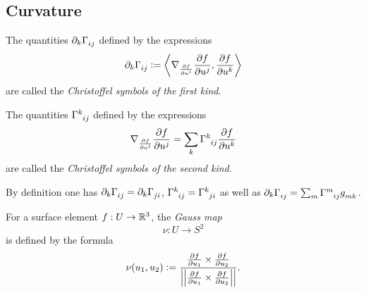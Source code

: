 \documentclass[stu, babel, american, biblatex, a4paper, leqno, draftall]{apa7}
\begin{document}
\subsection{Curvature}
\begin{definition}\label{Manifold:ChristoffelSymbol}
    
    \begin{APAenumerate}
        \item The quantities $\partial_k\tensor{\Gamma}{_i_j}$ defined by the expressions
              \begin{equation*}
                \partial_k\tensor{\Gamma}{_i_j}
                \defeq
                \inner{\nabla_{\frac{\partial f}{\partial\tensor{u}{^i}}}\frac{\partial f}{\partial\tensor{u}{^j}}}{\frac{\partial f}{\partial\tensor{u}{^k}}}
              \end{equation*}
              are called the \textit{Christoffel symbols of the first kind}.
        \item The quantities $\tensor{\Gamma}{^k_i_j}$ defined by the expressions
        \begin{equation*}
          \nabla_{\frac{\partial f}{\partial\tensor{u}{^i}}}\frac{\partial f}{\partial\tensor{u}{^j}}
          =
          \sum_k{\tensor{\Gamma}{^k_i_j}\frac{\partial f}{\partial\tensor{u}{^k}}}
        \end{equation*}
        are called the \textit{Christoffel symbols of the second kind}.
        \item By definition one has $\partial_k\tensor{\Gamma}{_i_j}=\partial_k\tensor{\Gamma}{_j_i}$, $\tensor{\Gamma}{^k_i_j}=\tensor{\Gamma}{^k_j_i}$
        as well as $\partial_k\tensor{\Gamma}{_i_j}=\sum_{m}\tensor{\Gamma}{^m_i_j}\tensor{g}{_m_k}$.
    \end{APAenumerate}
\end{definition}
\begin{definition}\label{Curvature:Gauss}
    For a surface element $f:U\to\mathbb{R}^{3}$, the \textit{Gauss map}
    \begin{equation*}
        \nu:U\to S^2
    \end{equation*}
    is defined by the formula
    \begin{equation*}
        \nu(u_1, u_2)
        \vcentcolon=
        \frac
        {\frac{\partial f}{\partial u_1}\times\frac{\partial f}{\partial u_2}}
        {\left|\left|{\frac{\partial f}{\partial u_1}\times\frac{\partial f}{\partial u_2}}\right|\right|}
        \text{.}
    \end{equation*}
\end{definition}
\end{document}
